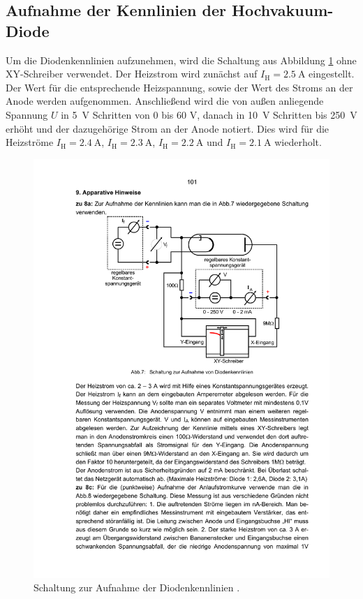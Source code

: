 \subsection{Aufnahme der Kennlinien der Hochvakuum-Diode}

Um die Diodenkennlinien aufzunehmen, wird die Schaltung aus Abbildung \ref{fig:aufbau1} ohne XY-Schreiber verwendet. Der Heizstrom wird zunächst auf   $I_\mathrm{H} = \SI{2.5}{\ampere}$ eingestellt. Der Wert für die entsprechende Heizspannung, sowie der Wert des Stroms an der Anode werden aufgenommen. Anschließend wird die von außen anliegende Spannung $U$ in \SI{5}{\volt} Schritten von 0 bis 60 \si{\volt}, danach in \SI{10}{\volt} Schritten bis \SI{250}{\volt} erhöht und der dazugehörige Strom an der Anode notiert. Dies wird für die Heizströme $I_\mathrm{H} = \SI{2.4}{\ampere}$, $I_\mathrm{H} = \SI{2.3}{\ampere}$, $I_\mathrm{H} = \SI{2.2}{\ampere}$ und $I_\mathrm{H} = \SI{2.1}{\ampere}$ wiederholt.

\begin{figure}
  \centering
  \includegraphics[scale=0.6]{content/aufbau1.pdf}
\caption{Schaltung zur Aufnahme der Diodenkennlinien \cite{anleitung504}.}
  \label{fig:aufbau1}
\end{figure}

